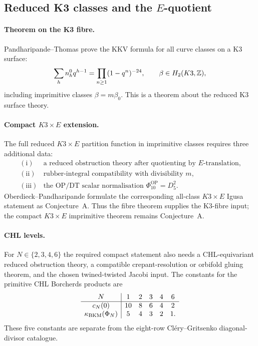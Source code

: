 \subsection*{Reduced K3 classes and the \(E\)-quotient}
\label{subsec:conj1-k3-classes}

\paragraph{Theorem on the K3 fibre.}
Pandharipande--Thomas prove the KKV formula for all curve classes on a K3
surface:
\[
        \sum_h n_h^0 q^{h-1}
        =
        \prod_{n\geq 1}(1-q^n)^{-24},
        \qquad
        \beta\in H_2(K3,\mathbb{Z}),
\]
including imprimitive classes \(\beta=m\beta_0\).  This is a theorem about
the reduced K3 surface theory.

\paragraph{Compact \(K3\times E\) extension.}
The full reduced \(K3\times E\) partition function in imprimitive classes
requires three additional data:
\[
\begin{array}{ll}
\mathrm{(i)}&
\text{a reduced obstruction theory after quotienting by \(E\)-translation,}\\
\mathrm{(ii)}&
\text{rubber-integral compatibility with divisibility \(m\),}\\
\mathrm{(iii)}&
\text{the OP/DT scalar normalisation } \Phi_{10}^{\mathrm{OP}}=D_5^2 .
\end{array}
\]
Oberdieck--Pandharipande formulate the corresponding all-class
\(K3\times E\) Igusa statement as Conjecture~A.  Thus the fibre theorem
supplies the K3-fibre input; the compact \(K3\times E\) imprimitive
theorem remains Conjecture~A.

\paragraph{CHL levels.}
For \(N\in\{2,3,4,6\}\) the required compact statement also needs a
CHL-equivariant reduced obstruction theory, a compatible
crepant-resolution or orbifold gluing theorem, and the chosen
twined-twisted Jacobi input.  The constants for the primitive CHL
Borcherds products are
\[
\begin{array}{c|ccccc}
N&1&2&3&4&6\\
\hline
c_N(0)&10&8&6&4&2\\
\kappa_{\mathrm{BKM}}(\Phi_N)&5&4&3&2&1 .
\end{array}
\]
These five constants are separate from the eight-row
Cl\'ery--Gritsenko diagonal-divisor catalogue.

